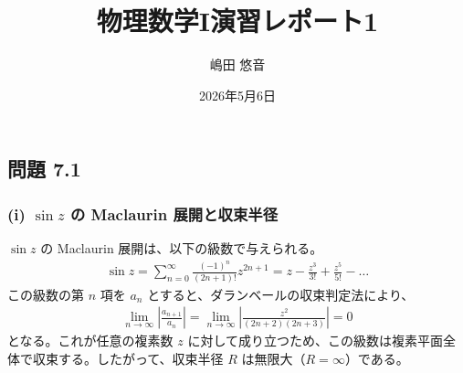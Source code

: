 \documentclass[platex,dvipdfmx,a4paper]{jsarticle}
\title{物理数学I演習レポート1}
\author{嶋田 悠音}
\date{2026年5月6日}
\begin{document}
  \maketitle
  \subsection*{問題 7.1}
  
  \subsubsection*{(i) $\sin z$ の Maclaurin 展開と収束半径}
  $\sin z$ の Maclaurin 展開は、以下の級数で与えられる。
  \begin{align*}
    \sin z = \sum_{n=0}^{\infty} \frac{(-1)^n}{(2n+1)!} z^{2n+1} = z - \frac{z^3}{3!} + \frac{z^5}{5!} - \dots
  \end{align*}
  この級数の第 $n$ 項を $a_n$ とすると、ダランベールの収束判定法により、
  \begin{align*}
    \lim_{n \to \infty} \left| \frac{a_{n+1}}{a_n} \right| = \lim_{n \to \infty} \left| \frac{z^2}{(2n+2)(2n+3)} \right| = 0
  \end{align*}
  となる。これが任意の複素数 $z$ に対して成り立つため、この級数は複素平面全体で収束する。したがって、収束半径 $R$ は無限大（$R = \infty$）である。
\end{document}
